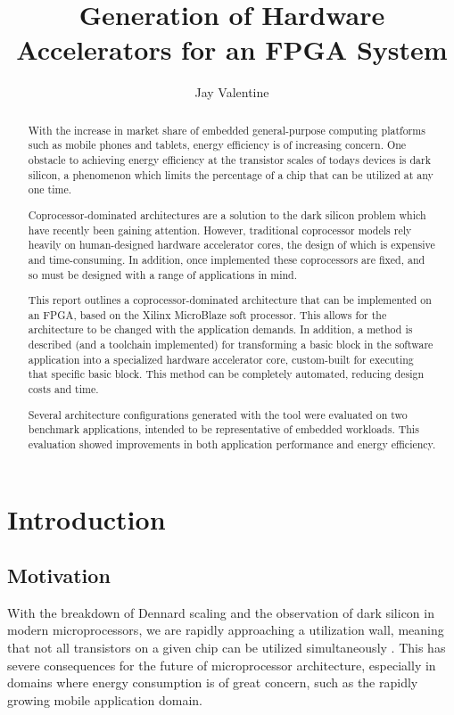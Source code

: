\documentclass{UoYCSproject}
\begin{document}
\title{Generation of Hardware Accelerators for an FPGA System}
\author{Jay Valentine}

\maketitle

\begin{abstract}
With the increase in market share of embedded general-purpose computing platforms such as mobile phones
and tablets, energy efficiency is of increasing concern. One obstacle to achieving energy efficiency
at the transistor scales of todays devices is dark silicon, a phenomenon which limits the percentage
of a chip that can be utilized at any one time.

Coprocessor-dominated architectures are a solution to the dark silicon problem which have recently been
gaining attention. However, traditional coprocessor models rely heavily on human-designed hardware accelerator
cores, the design of which is expensive and time-consuming. In addition, once implemented these coprocessors
are fixed, and so must be designed with a range of applications in mind. 

This report outlines a coprocessor-dominated architecture that can be implemented on an FPGA, based on the Xilinx
MicroBlaze soft processor. This allows for the architecture to be changed with the application demands.
In addition, a method is described (and a toolchain implemented) for transforming a basic block in the software application into
a specialized hardware accelerator core, custom-built for executing that specific basic block. This method can be completely
automated, reducing design costs and time.

Several architecture configurations generated with the tool were evaluated on two benchmark applications, intended to be
representative of embedded workloads. This evaluation showed improvements in both application performance and energy efficiency.
\end{abstract}

\chapter{Introduction}

\section{Motivation}

With the breakdown of Dennard scaling and the observation of dark silicon in modern microprocessors,
we are rapidly approaching a utilization wall, meaning that not all transistors on a given chip can be utilized
simultaneously \cite{darksilicon}. This has severe consequences for the future of microprocessor architecture,
especially in domains where energy consumption is of great concern, such as the rapidly growing mobile application domain.
\end{document}
